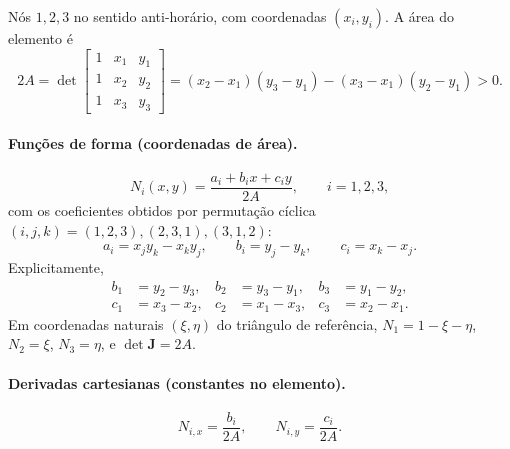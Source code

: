 \documentclass[11pt,a4paper]{article}
\numberwithin{equation}{section}
\begin{document}
Nós $1,2,3$ no sentido anti-horário, com coordenadas $(x_i,y_i)$.
A área do elemento é
\begin{equation}
2A=\det\begin{bmatrix}1&x_1&y_1\\1&x_2&y_2\\1&x_3&y_3\end{bmatrix}
=(x_2-x_1)(y_3-y_1)-(x_3-x_1)(y_2-y_1)>0.
\end{equation}

\paragraph{Funções de forma (coordenadas de área).}
\begin{equation}
\boxed{N_i(x,y)=\frac{a_i+b_ix+c_iy}{2A},\qquad i=1,2,3,}
\end{equation}
com os coeficientes obtidos por permutação cíclica $(i,j,k)=(1,2,3),(2,3,1),(3,1,2)$:
\begin{equation}
\boxed{a_i=x_jy_k-x_ky_j,\qquad b_i=y_j-y_k,\qquad c_i=x_k-x_j.}
\end{equation}
Explicitamente,
\begin{align}
b_1&=y_2-y_3, & b_2&=y_3-y_1, & b_3&=y_1-y_2,\\
c_1&=x_3-x_2, & c_2&=x_1-x_3, & c_3&=x_2-x_1.
\end{align}
Em coordenadas naturais $(\xi,\eta)$ do triângulo de referência,
$N_1=1-\xi-\eta$, $N_2=\xi$, $N_3=\eta$, e $\det\mathbf J=2A$.

\paragraph{Derivadas cartesianas (constantes no elemento).}
\begin{equation}
N_{i,x}=\frac{b_i}{2A},\qquad N_{i,y}=\frac{c_i}{2A}.
\end{equation}
\end{document}
